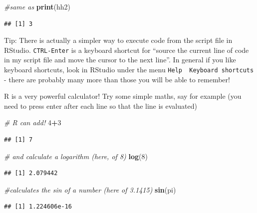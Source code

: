 \documentclass[
]{article}
\newenvironment{Shaded}{\begin{snugshade}}{\end{snugshade}}
\newcommand{\CommentTok}[1]{\textcolor[rgb]{0.56,0.35,0.01}{\textit{#1}}}
\newcommand{\DecValTok}[1]{\textcolor[rgb]{0.00,0.00,0.81}{#1}}
\newcommand{\FunctionTok}[1]{\textcolor[rgb]{0.13,0.29,0.53}{\textbf{#1}}}
\newcommand{\NormalTok}[1]{#1}
\newcommand{\SpecialCharTok}[1]{\textcolor[rgb]{0.81,0.36,0.00}{\textbf{#1}}}
\begin{document}
\begin{Shaded}
\begin{Highlighting}[]
\CommentTok{\#same as }
\FunctionTok{print}\NormalTok{(hh2)}
\end{Highlighting}
\end{Shaded}

\begin{verbatim}
## [1] 3
\end{verbatim}

Tip: There is actually a simpler way to execute code from the script
file in RStudio. \texttt{CTRL-Enter} is a keyboard shortcut for ``source
the current line of code in my script file and move the cursor to the
next line''. In general if you like keyboard shortcuts, look in RStudio
under the menu \texttt{Help\ \textbar{}\ Keyboard\ shortcuts} - there
are probably many more than those you will be able to remember!

R is a very powerful calculator! Try some simple maths, say for example
(you need to press enter after each line so that the line is evaluated)

\begin{Shaded}
\begin{Highlighting}[]
\CommentTok{\# R can add!}
\DecValTok{4}\SpecialCharTok{+}\DecValTok{3}
\end{Highlighting}
\end{Shaded}

\begin{verbatim}
## [1] 7
\end{verbatim}

\begin{Shaded}
\begin{Highlighting}[]
\CommentTok{\# and calculate a logarithm (here, of 8)}
\FunctionTok{log}\NormalTok{(}\DecValTok{8}\NormalTok{)}
\end{Highlighting}
\end{Shaded}

\begin{verbatim}
## [1] 2.079442
\end{verbatim}

\begin{Shaded}
\begin{Highlighting}[]
\CommentTok{\#calculates the sin of a number (here of 3.1415)}
\FunctionTok{sin}\NormalTok{(pi)}
\end{Highlighting}
\end{Shaded}

\begin{verbatim}
## [1] 1.224606e-16
\end{verbatim}
\end{document}
